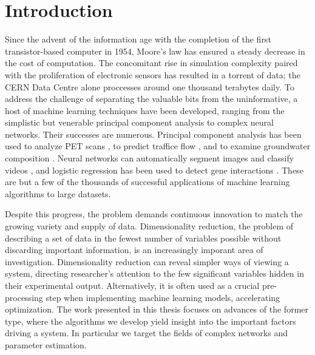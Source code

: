 \chapter{Introduction\label{ch:intro}}

Since the advent of the information age with the completion of the
first transistor-based computer in 1954, Moore's law has ensured a
steady decrease in the cost of computation. The concomitant rise in
simulation complexity paired with the proliferation of electronic
sensors has resulted in a torrent of data; the CERN Data Centre alone
proccesses around one thousand terabytes daily. To address the
challenge of separating the valuable bits from the uninformative, a
host of machine learning techniques have been developed, ranging from
the simplistic but venerable principal component analysis to complex
neural networks. Their successes are numerous. Principal component
analysis has been used to analyze PET scans \cite{Functional
  Connectivity: The Principal-Component Analysis of Large (PET) Data
  Sets}, to predict traffice flow \cite{Forecasting Approach for
  Short-term Traffic Flow based on Principal Component Analysis and
  Combined Neural Network}, and to examine groundwater composition
\cite{Temporal evolution of groundwater composition in an alluvial
  aquifer (Pisuerga River, Spain) by principal component
  analysis}. Neural networks can automatically segment images and
classify videos \cite{Large-scale video classification with
  convolutional neural networks; Conditional Random Fields as
  Recurrent Neural Networks}, and logistic regression has been used to
detect gene interactions \cite{Penalized logistic regression for
  detecting gene interactions}. These are but a few of the thousands
of successful applications of machine learning algorithms to large
datasets.

Despite this progress, the problem demands continuous innovation to
match the growing variety and supply of data. Dimensionality
reduction, the problem of describing a set of data in the fewest
number of variables possible without discarding important information,
is an increasingly imporant area of investigation. Dimensionality
reduction can reveal simpler ways of viewing a system, directing
researcher's attention to the few significant variables hidden in
their experimental output. Alternatively, it is often used as a
crucial pre-processing step when implementing machine learning models,
accelerating optimization. The work presented in this thesis focuses
on advances of the former type, where the algorithms we develop yield
insight into the important factors driving a system. In particular we
target the fields of complex networks and parameter estimation.

